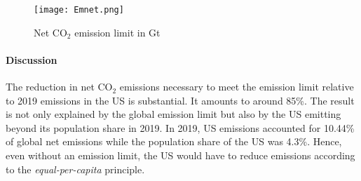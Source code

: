 % 


%			

\begin{figure}
	\caption{Net CO$_2$ emission limit in Gt}\label{fig:emlimit}
	\texttt{[image: Emnet.png]}
\end{figure}

\paragraph{Discussion}
The reduction in net CO$_2$ emissions necessary to meet the emission limit relative to 2019 emissions in the US  is substantial. It amounts to around 85\%. The result is not only explained by the global emission limit but also by the US emitting beyond its population share in 2019. In 2019, US emissions accounted for 10.44\% of global net emissions while the population share of the US was 4.3\%. Hence, even without an emission limit, the US would have to reduce emissions according to the \textit{equal-per-capita} principle.

